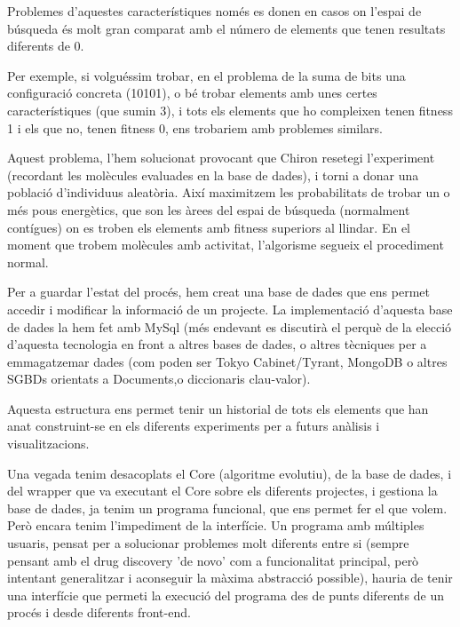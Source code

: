 \documentclass[titlepage,a4paper,12pt]{book}
\begin{document}
Problemes d'aquestes característiques només es donen en casos on l'espai de
búsqueda és molt gran comparat amb el número de elements que tenen resultats
diferents de 0.

Per exemple, si volguéssim trobar, en el problema de la suma de bits una
configuració concreta (10101), o bé trobar elements amb unes certes
característiques (que sumin 3), i tots els elements que ho compleixen tenen
fitness 1 i els que no, tenen fitness 0, ens trobariem amb problemes similars.

Aquest problema, l'hem solucionat provocant que Chiron resetegi l'experiment
(recordant les molècules evaluades en la base de dades), i torni a donar una
població d'individuus aleatòria.  Així maximitzem les probabilitats de trobar un
o més pous energètics, que son les àrees del espai de búsqueda (normalment
contígues) on es troben els elements amb fitness superiors al llindar.  En el
moment que trobem molècules amb activitat, l'algorisme segueix el procediment
normal.

Per a guardar l'estat del procés, hem creat una base de dades que ens permet
accedir i modificar la informació de un projecte.  La implementació d'aquesta
base de dades la hem fet amb MySql (més endevant es discutirà el perquè de la
elecció d'aquesta tecnologia en front a altres bases de dades, o altres
tècniques per a emmagatzemar dades (com poden ser Tokyo Cabinet/Tyrant, MongoDB
o altres SGBDs orientats a Documents,o diccionaris clau-valor).

\lstset{language=sql, tabsize=2}
\lstset{commentstyle=\textit}


Aquesta estructura ens permet tenir un historial de tots els elements que han
anat construint-se en els diferents experiments per a futurs anàlisis i
visualitzacions.

Una vegada tenim desacoplats el Core (algoritme evolutiu), de la base de dades,
i del wrapper que va executant el Core sobre els diferents projectes, i gestiona
la base de dades, ja tenim un programa funcional, que ens permet fer el que
volem.  Però encara tenim l'impediment de la interfície.  Un programa amb
múltiples usuaris, pensat per a solucionar problemes molt diferents entre si
(sempre pensant amb el drug discovery 'de novo' com a funcionalitat principal,
 però intentant generalitzar i aconseguir la màxima abstracció possible), hauria
de tenir una interfície que permeti la execució del programa des de punts
diferents de un procés i desde diferents front-end.  
\end{document}
